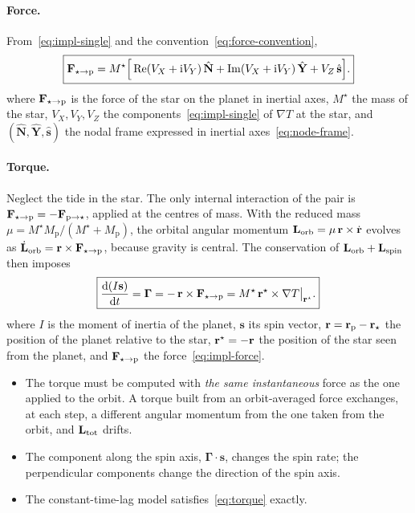 \paragraph{Force.} From~\eqref{eq:impl-single} and the convention~\eqref{eq:force-convention},
\begin{equation}
  \boxed{\mathbf F_{\star\to\mathrm p}=M^\star\Big[\operatorname{Re}(V_X+\mathrm{i} V_Y)\,\hat{\mathbf N}+\operatorname{Im}(V_X+\mathrm{i} V_Y)\,\hat{\mathbf Y}+V_Z\,\hat{\mathbf s}\Big].} \label{eq:impl-force}
\end{equation}
where $\mathbf F_{\star\to\mathrm p}$ is the force of the star on the planet in inertial axes, $M^\star$ the mass of the star, $V_X,V_Y,V_Z$ the components~\eqref{eq:impl-single} of $\nabla T$ at the star, and $(\hat{\mathbf N},\hat{\mathbf Y},\hat{\mathbf s})$ the nodal frame expressed in inertial axes~\eqref{eq:node-frame}.

\paragraph{Torque.} Neglect the tide in the star. The only internal interaction of the pair is $\mathbf F_{\star\to\mathrm p}=-\mathbf F_{\mathrm p\to\star}$, applied at the centres of mass. With the reduced mass $\mu=M^\star M_{\mathrm p}/(M^\star+M_{\mathrm p})$, the orbital angular momentum $\mathbf L_{\rm orb}=\mu\,\mathbf r\times\dot{\mathbf r}$ evolves as $\dot{\mathbf L}_{\rm orb}=\mathbf r\times\mathbf F_{\star\to\mathrm p}$, because gravity is central. The conservation of $\mathbf L_{\rm orb}+\mathbf L_{\rm spin}$ then imposes
\begin{equation}
  \boxed{\frac{\mathrm{d}(I\mathbf s)}{\mathrm{d} t}=\boldsymbol\Gamma=-\,\mathbf r\times\mathbf F_{\star\to\mathrm p}=M^\star\,\mathbf r^\star\times\nabla T\big|_{\mathbf r^\star}.} \label{eq:torque}
\end{equation}
where $I$ is the moment of inertia of the planet, $\mathbf s$ its spin vector, $\mathbf r=\mathbf r_{\mathrm p}-\mathbf r_\star$ the position of the planet relative to the star, $\mathbf r^\star=-\mathbf r$ the position of the star seen from the planet, and $\mathbf F_{\star\to\mathrm p}$ the force~\eqref{eq:impl-force}.
\begin{itemize}
  \item The torque must be computed with \emph{the same instantaneous} force as the one applied to the orbit. A torque built from an orbit-averaged force exchanges, at each step, a different angular momentum from the one taken from the orbit, and $\mathbf L_{\rm tot}$ drifts.
  \item The component along the spin axis, $\boldsymbol\Gamma\cdot\hat{\mathbf s}$, changes the spin rate; the perpendicular components change the direction of the spin axis.
  \item The constant-time-lag model \citep{Hut1981,Bolmont2015} satisfies~\eqref{eq:torque} exactly.
\end{itemize}

